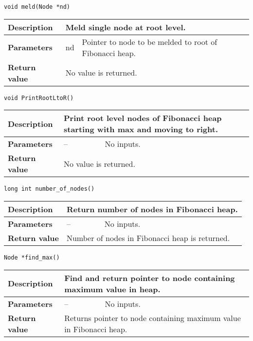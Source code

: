 \documentclass[12pt, reqno]{amsart}
\begin{document}
{\large \texttt{void meld(Node *nd)}}
\begin{center}
    \begin{tabular}{| l | p{2.5cm} | p{9.5cm} |}
    \hline
    {\bfseries Description} & \multicolumn{2}{p{12.5cm}|}{Meld single node at root level.} \\ \hline
    \multirow{1}{*}{\bfseries Parameters} & nd & Pointer to node to be melded to root of Fibonacci heap. \\ \hline
    {\bfseries Return value} & \multicolumn{2}{p{12.5cm}|}{No value is returned.} \\ \hline
    \end{tabular}
\end{center}  
\vspace{3mm}   

{\large \texttt{void PrintRootLtoR()}}
\begin{center}
    \begin{tabular}{| l | p{2.5cm} | p{9.5cm} |}
    \hline
    {\bfseries Description} & \multicolumn{2}{p{12.5cm}|}{Print root level nodes of Fibonacci heap starting with max and moving to right.} \\ \hline
    \multirow{1}{*}{\bfseries Parameters} & -- & No inputs. \\ \hline
    {\bfseries Return value} & \multicolumn{2}{p{12.5cm}|}{No value is returned.} \\ \hline
    \end{tabular}
\end{center}
\vspace{3mm}   

{\large \texttt{long int number\_of\_nodes()}}
\begin{center}
    \begin{tabular}{| l | p{2.5cm} | p{9.5cm} |}
    \hline
    {\bfseries Description} & \multicolumn{2}{p{12.5cm}|}{Return number of nodes in Fibonacci heap.} \\ \hline
    \multirow{1}{*}{\bfseries Parameters} & -- & No inputs. \\ \hline
    {\bfseries Return value} & \multicolumn{2}{p{12.5cm}|}{Number of nodes in Fibonacci heap is returned.} \\ \hline
    \end{tabular}
\end{center}
\vspace{3mm}   

{\large \texttt{Node *find\_max()}}
\begin{center}
    \begin{tabular}{| l | p{2.5cm} | p{9.5cm} |}
    \hline
    {\bfseries Description} & \multicolumn{2}{p{12.5cm}|}{Find and return pointer to node containing maximum value in heap.} \\ \hline
    \multirow{1}{*}{\bfseries Parameters} & -- & No inputs. \\ \hline
    {\bfseries Return value} & \multicolumn{2}{p{12.5cm}|}{Returns pointer to node containing maximum value in Fibonacci heap.} \\ \hline
    \end{tabular}
\end{center}
\vspace{3mm}   
\end{document}
